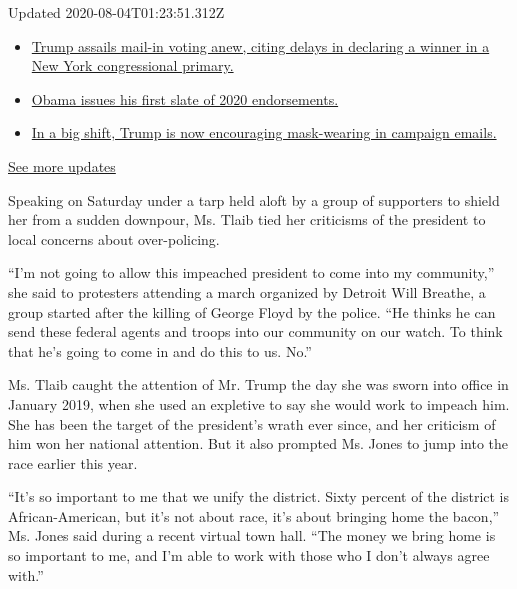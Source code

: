 Updated 2020-08-04T01:23:51.312Z

\begin{itemize}
\tightlist
\item
  \href{https://www.nytimes3xbfgragh.onion/2020/08/03/us/elections/biden-vs-trump.html?action=click\&pgtype=Article\&state=default\&region=MAIN_CONTENT_1\&context=storylines_live_updates\#link-6494b448}{Trump
  assails mail-in voting anew, citing delays in declaring a winner in a
  New York congressional primary.}
\item
  \href{https://www.nytimes3xbfgragh.onion/2020/08/03/us/elections/biden-vs-trump.html?action=click\&pgtype=Article\&state=default\&region=MAIN_CONTENT_1\&context=storylines_live_updates\#link-3de249e6}{Obama
  issues his first slate of 2020 endorsements.}
\item
  \href{https://www.nytimes3xbfgragh.onion/2020/08/03/us/elections/biden-vs-trump.html?action=click\&pgtype=Article\&state=default\&region=MAIN_CONTENT_1\&context=storylines_live_updates\#link-54e34d20}{In
  a big shift, Trump is now encouraging mask-wearing in campaign
  emails.}
\end{itemize}

\href{https://www.nytimes3xbfgragh.onion/2020/08/03/us/elections/biden-vs-trump.html?action=click\&pgtype=Article\&state=default\&region=MAIN_CONTENT_1\&context=storylines_live_updates}{See
more updates}

Speaking on Saturday under a tarp held aloft by a group of supporters to
shield her from a sudden downpour, Ms. Tlaib tied her criticisms of the
president to local concerns about over-policing.

``I'm not going to allow this impeached president to come into my
community,'' she said to protesters attending a march organized by
Detroit Will Breathe, a group started after the killing of George Floyd
by the police. ``He thinks he can send these federal agents and troops
into our community on our watch. To think that he's going to come in and
do this to us. No.''

Ms. Tlaib caught the attention of Mr. Trump the day she was sworn into
office in January 2019, when she used an expletive to say she would work
to impeach him. She has been the target of the president's wrath ever
since, and her criticism of him won her national attention. But it also
prompted Ms. Jones to jump into the race earlier this year.

``It's so important to me that we unify the district. Sixty percent of
the district is African-American, but it's not about race, it's about
bringing home the bacon,'' Ms. Jones said during a recent virtual town
hall. ``The money we bring home is so important to me, and I'm able to
work with those who I don't always agree with.''


